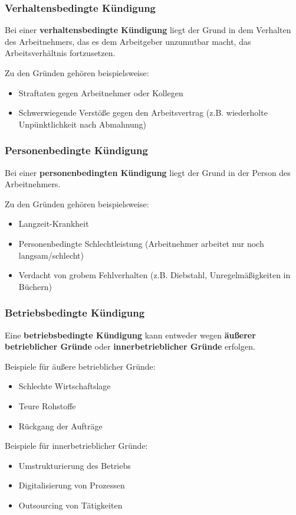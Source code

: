 \documentclass[12pt,A4]{extarticle}
\newcommand{\highlight}[1]{\textcolor{highlightColor}{\textbf{#1}}}
\begin{document}
\subsubsection{Verhaltensbedingte Kündigung}
Bei einer \highlight{verhaltensbedingte Kündigung} liegt der Grund in dem Verhalten des Arbeitnehmers, das es dem Arbeitgeber unzumutbar macht, das Arbeitsverhältnis fortzusetzen.\par
Zu den Gründen gehören beispielsweise:
\begin{itemize}
  \item{Straftaten gegen Arbeitnehmer oder Kollegen}
  \item{Schwerwiegende Verstöße gegen den Arbeitsvertrag (z.B. wiederholte Unpünktlichkeit nach Abmahnung)}
\end{itemize}

\subsubsection{Personenbedingte Kündigung}
Bei einer \highlight{personenbedingten Kündigung} liegt der Grund in der Person des Arbeitnehmers.\par
Zu den Gründen gehören beispielsweise:
\begin{itemize}
  \item{Langzeit-Krankheit}
  \item{Personenbedingte Schlechtleistung (Arbeitnehmer arbeitet nur noch langsam/schlecht)}
  \item{Verdacht von grobem Fehlverhalten (z.B. Diebstahl, Unregelmäßigkeiten in Büchern)}
\end{itemize}

\subsubsection{Betriebsbedingte Kündigung}\label{sec:betriebsbedingteKuendigung}
Eine \highlight{betriebsbedingte Kündigung} kann entweder wegen \textbf{äußerer betrieblicher Gründe} oder \textbf{innerbetrieblicher Gründe} erfolgen.\par
Beispiele für äußere betrieblicher Gründe:
\begin{itemize}
  \item{Schlechte Wirtschaftslage}
  \item{Teure Rohstoffe}
  \item{Rückgang der Aufträge}
\end{itemize}
Beispiele für innerbetrieblicher Gründe:
\begin{itemize}
  \item{Umstrukturierung des Betriebs}
  \item{Digitalisierung von Prozessen}
  \item{Outsourcing von Tätigkeiten}
\end{itemize}
\end{document}
